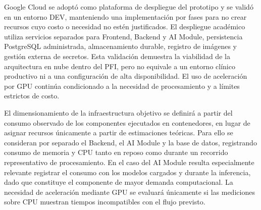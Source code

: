 Google Cloud se adoptó como plataforma de despliegue del prototipo y se validó en un entorno DEV, manteniendo una implementación por fases para no crear recursos cuyo costo o necesidad no estén justificados. El despliegue académico utiliza servicios separados para Frontend, Backend y AI Module, persistencia PostgreSQL administrada, almacenamiento durable, registro de imágenes y gestión externa de secretos. Esta validación demuestra la viabilidad de la arquitectura en nube dentro del PFI, pero no equivale a un entorno clínico productivo ni a una configuración de alta disponibilidad. El uso de aceleración por GPU continúa condicionado a la necesidad de procesamiento y a límites estrictos de costo.

El dimensionamiento de la infraestructura objetivo se definirá a partir del consumo observado de los componentes ejecutados en contenedores, en lugar de asignar recursos únicamente a partir de estimaciones teóricas. Para ello se consideran por separado el Backend, el AI Module y la base de datos, registrando consumo de memoria y CPU tanto en reposo como durante un recorrido representativo de procesamiento. En el caso del AI Module resulta especialmente relevante registrar el consumo con los modelos cargados y durante la inferencia, dado que constituye el componente de mayor demanda computacional. La necesidad de aceleración mediante GPU se evaluará únicamente si las mediciones sobre CPU muestran tiempos incompatibles con el flujo previsto.

